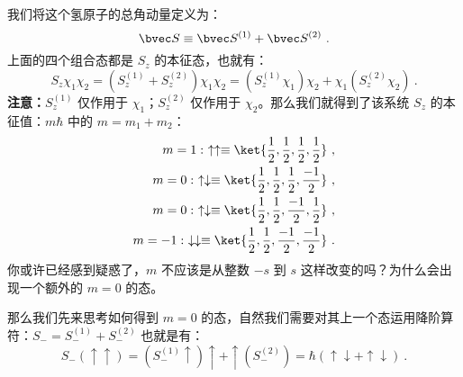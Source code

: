 我们将这个氢原子的总角动量定义为：
\begin{equation}
\bvec S \equiv \bvec S^{(1)}+\bvec S^{(2)}~.
\end{equation}
上面的四个组合态都是 $S_z$ 的本征态，也就有：
\begin{equation}
S_z\chi_1\chi_2=(S_z^{(1)}+S_z^{(2)})\chi_1\chi_2=(S_z^{(1)}\chi_1)\chi_2+\chi_1(S_z^{(2)}\chi_2)~.
\end{equation}
\textbf{注意：}$S_z^{(1)}$ 仅作用于 $\chi_1$；$S_z^{(2)}$ 仅作用于 $\chi_2$。那么我们就得到了该系统 $S_z$ 的本征值：$m\hbar$ 中的 $m=m_1+m_2$：
\begin{align}
m=1: \ \uparrow\uparrow\equiv \ket{\frac{1}{2},\frac{1}{2},\frac{1}{2},\frac{1}{2}}~,\\
m=0: \ \uparrow\downarrow\equiv \ket{\frac{1}{2},\frac{1}{2},\frac{1}{2},\frac{-1}{2}}~,\\
m=0: \ \uparrow\downarrow\equiv \ket{\frac{1}{2},\frac{1}{2},\frac{-1}{2},\frac{1}{2}}~,\\ 
m=-1:\ \downarrow\downarrow\equiv \ket{\frac{1}{2},\frac{1}{2},\frac{-1}{2},\frac{-1}{2}}~.
\end{align}
你或许已经感到疑惑了，$m$ 不应该是从整数 $-s$ 到 $s$ 这样改变的吗？为什么会出现一个额外的 $m=0$ 的态。

那么我们先来思考如何得到 $m=0$ 的态，自然我们需要对其上一个态运用降阶算符：$S_-=S_-^{(1)}+S_-^{(2)}$ 也就是有：
\begin{equation}
S_-(\uparrow\uparrow)=(S_-^{(1)}\uparrow)\uparrow+\uparrow(S_-^{(2)})=\hbar(\uparrow\downarrow+\uparrow\downarrow)~.
\end{equation}


